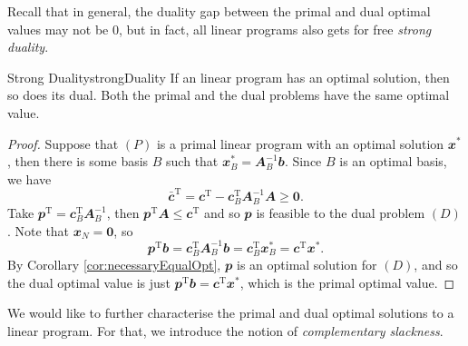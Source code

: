 \documentclass[math, code]{amznotes}
\theoremstyle{remark}
\begin{document}
Recall that in general, the duality gap between the primal and dual optimal values may not be $0$, but in fact, all linear programs also gets for free \textit{strong duality}.
\begin{thmbox}{Strong Duality}{strongDuality}
    If an linear program has an optimal solution, then so does its dual. Both the primal and the dual problems have the same optimal value.
    \tcblower
    \begin{proof}
        Suppose that $(P)$ is a primal linear program with an optimal solution $\mathbfit{x}^*$, then there is some basis $B$ such that $\mathbfit{x}^*_B = \mathbfit{A}_B^{-1}\mathbfit{b}$. Since $B$ is an optimal basis, we have 
        \begin{equation*}
            \bar{\mathbfit{c}}^{\mathrm{T}} = \mathbfit{c}^{\mathrm{T}} - \mathbfit{c}_B^{\mathrm{T}}\mathbfit{A}_B^{-1}\mathbfit{A} \geq \mathbf{0}.
        \end{equation*}
        Take $\mathbfit{p}^{\mathrm{T}} = \mathbfit{c}_B^{\mathrm{T}}\mathbfit{A}_B^{-1}$, then $\mathbfit{p}^{\mathrm{T}}\mathbfit{A} \leq \mathbfit{c}^{\mathrm{T}}$ and so $\mathbfit{p}$ is feasible to the dual problem $(D)$. Note that $\mathbfit{x}_N = \mathbf{0}$, so 
        \begin{equation*}
            \mathbfit{p}^{\mathrm{T}}\mathbfit{b} = \mathbfit{c}_B^{\mathrm{T}}\mathbfit{A}_B^{-1}\mathbfit{b} = \mathbfit{c}_B^{\mathrm{T}}\mathbfit{x}^*_B = \mathbfit{c}^{\mathrm{T}}\mathbfit{x}^*.
        \end{equation*}
        By Corollary \ref{cor:necessaryEqualOpt}, $\mathbfit{p}$ is an optimal solution for $(D)$, and so the dual optimal value is just $\mathbfit{p}^{\mathrm{T}}\mathbfit{b} = \mathbfit{c}^{\mathrm{T}}\mathbfit{x}^*$, which is the primal optimal value.
    \end{proof}
\end{thmbox}
We would like to further characterise the primal and dual optimal solutions to a linear program. For that, we introduce the notion of \textit{complementary slackness}.
\end{document}
